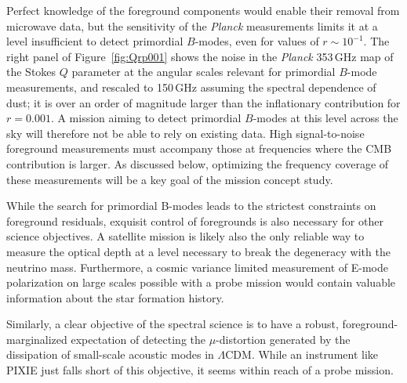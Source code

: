 Perfect knowledge of the foreground components would enable their
removal from microwave data, but the sensitivity of the \emph{Planck}
measurements limits it at a level insufficient to detect primordial
$B$-modes, even for values of $r\!\sim\!10^{-1}$. The right panel of
Figure~\ref{fig:Qrp001} shows the noise in the \emph{Planck} 353\,GHz
map of the Stokes $Q$ parameter at the angular scales relevant for
primordial $B$-mode measurements, and rescaled to 150\,GHz assuming
the spectral dependence of dust; it is over an order of magnitude
larger than the inflationary contribution for $r=0.001$.  A mission
aiming to detect primordial $B$-modes at this level across the sky
will therefore not be able to rely on existing data. High
signal-to-noise foreground measurements must accompany those at
frequencies where the CMB contribution is larger.  As discussed below,
optimizing the frequency coverage of these measurements will be a key
goal of the mission concept study.

While the search for primordial B-modes leads to the strictest constraints on foreground residuals, exquisit control of foregrounds is also necessary for other science objectives. A satellite mission is likely also the only reliable way to measure the optical depth at a level necessary to break the degeneracy with the neutrino mass. Furthermore, a cosmic variance limited measurement of E-mode polarization on large scales possible with a probe mission would contain valuable information about the star formation history. 

Similarly, a clear objective of the spectral science is to have a robust, foreground-marginalized expectation of detecting the $\mu$-distortion generated by the dissipation of small-scale acoustic modes in $\Lambda$CDM. While an instrument like PIXIE just falls short of this objective, it seems within reach of a probe mission.

